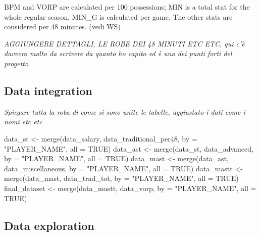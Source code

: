 \documentclass[
]{article}
\newenvironment{Shaded}{\begin{snugshade}}{\end{snugshade}}
\newcommand{\AttributeTok}[1]{\textcolor[rgb]{0.77,0.63,0.00}{#1}}
\newcommand{\ConstantTok}[1]{\textcolor[rgb]{0.00,0.00,0.00}{#1}}
\newcommand{\FunctionTok}[1]{\textcolor[rgb]{0.00,0.00,0.00}{#1}}
\newcommand{\NormalTok}[1]{#1}
\newcommand{\OtherTok}[1]{\textcolor[rgb]{0.56,0.35,0.01}{#1}}
\newcommand{\StringTok}[1]{\textcolor[rgb]{0.31,0.60,0.02}{#1}}
\begin{document}
BPM and VORP are calculated per 100 possessions; MIN is a total stat for
the whole regular season, MIN\_G is calculated per game. The other stats
are considered per 48 minutes. (vedi WS)

\emph{AGGIUNGERE DETTAGLI, LE ROBE DEI 48 MINUTI ETC ETC, qui c'è
davvero molto da scrivere da quanto ho capito ed è uno dei punti forti
del progetto}

\hypertarget{data-integration}{%
\subsection{Data integration}\label{data-integration}}

\emph{Spiegare tutta la roba di come si sono unite le tabelle,
aggiustato i dati come i nomi etc etc}

\begin{Shaded}
\begin{Highlighting}[]
\NormalTok{data\_st }\OtherTok{\textless{}{-}} \FunctionTok{merge}\NormalTok{(data\_salary, data\_traditional\_per48, }\AttributeTok{by =} \StringTok{"PLAYER\_NAME"}\NormalTok{, }\AttributeTok{all =} \ConstantTok{TRUE}\NormalTok{)}
\NormalTok{data\_ast }\OtherTok{\textless{}{-}} \FunctionTok{merge}\NormalTok{(data\_st, data\_advanced, }\AttributeTok{by =} \StringTok{"PLAYER\_NAME"}\NormalTok{, }\AttributeTok{all =} \ConstantTok{TRUE}\NormalTok{)}
\NormalTok{data\_mast }\OtherTok{\textless{}{-}} \FunctionTok{merge}\NormalTok{(data\_ast, data\_miscellaneous, }\AttributeTok{by =} \StringTok{"PLAYER\_NAME"}\NormalTok{, }\AttributeTok{all =} \ConstantTok{TRUE}\NormalTok{)}
\NormalTok{data\_mastt }\OtherTok{\textless{}{-}} \FunctionTok{merge}\NormalTok{(data\_mast, data\_trad\_tot, }\AttributeTok{by =} \StringTok{"PLAYER\_NAME"}\NormalTok{, }\AttributeTok{all =} \ConstantTok{TRUE}\NormalTok{)}
\NormalTok{final\_dataset }\OtherTok{\textless{}{-}} \FunctionTok{merge}\NormalTok{(data\_mastt, data\_vorp, }\AttributeTok{by =} \StringTok{"PLAYER\_NAME"}\NormalTok{, }\AttributeTok{all =} \ConstantTok{TRUE}\NormalTok{)}
\end{Highlighting}
\end{Shaded}

\hypertarget{data-exploration}{%
\subsection{Data exploration}\label{data-exploration}}
\end{document}
